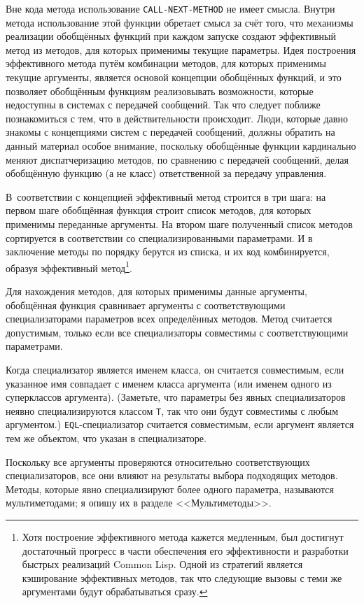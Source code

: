 Вне кода метода использование \lstinline{CALL-NEXT-METHOD} не имеет смысла.  Внутри метода
использование этой функции обретает смысл за счёт того, что механизмы реализации
обобщённых функций при каждом запуске создают эффективный метод из методов, для которых
применимы текущие параметры.  Идея построения эффективного метода путём комбинации
методов, для которых применимы текущие аргументы, является основой концепции обобщённых
функций, и это позволяет обобщённым функциям реа\-ли\-зо\-вы\-вать возможности, которые недоступны
в системах с передачей сообщений.  Так что следует поближе познакомиться с тем, что в
действительности происходит.  Люди, которые давно знакомы с концепциями систем с передачей
сообщений, должны обратить на данный материал особое внимание, поскольку обобщённые функции
кардинально меняют диспатчеризацию методов, по сравнению с передачей сообщений, делая
обобщённую функцию (а не класс) ответственной за передачу управления.

В~соответствии с концепцией эффективный метод строится в три шага: на первом шаге
обобщённая функция строит список методов, для которых применимы переданные аргументы.  На
втором шаге полученный список методов сортируется в соответствии со специализированными
параметрами.  И в заключение методы по порядку берутся из списка, и их код комбинируется,
образуя эффективный метод\footnote{Хотя построение эффективного метода кажется медленным,
  был достигнут достаточный прогресс в части обеспечения его эффективности и разработки
  быстрых реализаций Common Lisp.  Одной из стратегий является кэширование эффективных
  методов, так что следующие вызовы с теми же аргументами будут обрабатываться сразу.}.

Для нахождения методов, для которых применимы данные аргументы, обобщённая функция
сравнивает аргументы с соответствующими специализаторами параметров всех определённых
методов.  Метод считается допустимым, только если все специализаторы совместимы с
соответствующими параметрами.

Когда специализатор является именем класса, он считается совместимым, если указанное имя
совпадает с именем класса аргумента (или именем одного из суперклассов аргумента).
(Заметьте, что параметры без явных специализаторов неявно специализируются классом
\lstinline{T}, так что они будут совместимы с любым аргументом.)  \lstinline{EQL}-специализатор
считается совместимым, если аргумент является тем же объектом, что указан в
специализаторе.

Поскольку все аргументы проверяются относительно соответствующих специализаторов, все они
влияют на результаты выбора подходящих методов.  Методы, которые явно специализируют более
одного параметра, называются мультиметодами; я опишу их в разделе <<Мультиметоды>>.

